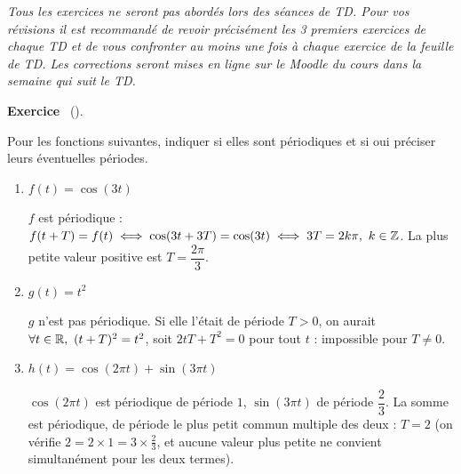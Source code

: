 \documentclass[a4paper,11pt]{article}
\title{\chapterTitle}
\author{}
\date{}
\makeatletter
\theoremstyle{definition}
\renewcommand\maketitle{{\raggedright\begin{center}
    {\Huge\bfseries\@title}
\end{center}}}
\newcounter{exercice}   %
\newenvironment{exercice}[1][]{%
  \refstepcounter{exercice}%
  \par\noindent\textbf{Exercice \theexercice}\if\relax\detokenize{#1}\relax\else\ (#1)\fi.\par\noindent\ignorespaces\vspace{1em}
}{\par\vspace{1em}}
\makeatother
\begin{document}
\selectfont
\fontsize{12pt}{14pt}\selectfont

\maketitle
\thispagestyle{fancy}
\setcounter{exercice}{0}

\vspace{2em}
\textit{Tous les exercices ne seront pas abordés lors des séances de TD. Pour vos révisions il est recommandé de revoir précisément les 3 premiers exercices de chaque TD et de vous confronter au moins une fois à chaque exercice de la feuille de TD. Les corrections seront mises en ligne sur le Moodle du cours dans la semaine qui suit le TD.}
\vspace{2em}


\begin{exercice}
    Pour les fonctions suivantes, indiquer si elles sont périodiques et si oui préciser leurs éventuelles périodes.
    \begin{enumerate}[\bfseries 1.]
        \item $f(t) = \cos(3t)$
        \begin{solution}
            $f$ est périodique : $f(t+T) = f(t) \iff \cos(3t+3T) = \cos(3t) \iff 3T = 2k\pi,\ k\in{\mathbb{Z}}$. La plus petite valeur positive est $T = \dfrac{2\pi}{3}$.
        \end{solution}

        \item $g(t) = t^2$
        \begin{solution}
            $g$ n'est pas périodique. Si elle l'était de période $T>0$, on aurait $\forall t\in{\mathbb{R}},\ (t+T)^2 = t^2$, soit $2tT + T^2 = 0$ pour tout $t$ : impossible pour $T\neq 0$.
        \end{solution}

        \item $h(t) = \cos(2\pi t) + \sin(3\pi t)$
        \begin{solution}
            $\cos(2\pi t)$ est périodique de période $1$, $\sin(3\pi t)$ de période $\dfrac{2}{3}$. La somme est périodique, de période le plus petit commun multiple des deux : $T = 2$ (on vérifie $2 = 2\times1 = 3\times\frac{2}{3}$, et aucune valeur plus petite ne convient simultanément pour les deux termes).
        \end{solution}
    \end{enumerate}
\end{exercice}
\end{document}
